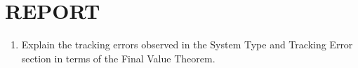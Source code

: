 \documentclass[11pt,a4paper]{article}
\begin{document}
\section{REPORT}

\begin{enumerate}

\item Explain the tracking errors observed in the System Type and Tracking Error section in terms of the Final Value Theorem.







\end{enumerate}
\end{document}

